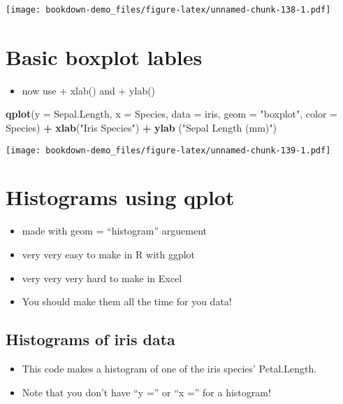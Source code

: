 \documentclass[]{book}
\newenvironment{Shaded}{\begin{snugshade}}{\end{snugshade}}
\newcommand{\KeywordTok}[1]{\textcolor[rgb]{0.13,0.29,0.53}{\textbf{#1}}}
\newcommand{\DataTypeTok}[1]{\textcolor[rgb]{0.13,0.29,0.53}{#1}}
\newcommand{\StringTok}[1]{\textcolor[rgb]{0.31,0.60,0.02}{#1}}
\newcommand{\OperatorTok}[1]{\textcolor[rgb]{0.81,0.36,0.00}{\textbf{#1}}}
\newcommand{\NormalTok}[1]{#1}
\providecommand{\tightlist}{%
  \setlength{\itemsep}{0pt}\setlength{\parskip}{0pt}}
\theoremstyle{definition}
\theoremstyle{definition}
\theoremstyle{definition}
\theoremstyle{remark}
\begin{document}
\texttt{[image: bookdown-demo\_files/figure-latex/unnamed-chunk-138-1.pdf]}

\section{Basic boxplot lables}\label{basic-boxplot-lables}

\begin{itemize}
\tightlist
\item
  now use + xlab() and + ylab()
\end{itemize}

\begin{Shaded}
\begin{Highlighting}[]
\KeywordTok{qplot}\NormalTok{(}\DataTypeTok{y =}\NormalTok{ Sepal.Length,}
      \DataTypeTok{x =}\NormalTok{ Species,    }
        \DataTypeTok{data =}\NormalTok{ iris,}
      \DataTypeTok{geom =} \StringTok{"boxplot"}\NormalTok{,}
      \DataTypeTok{color =}\NormalTok{ Species) }\OperatorTok{+}
\StringTok{  }\KeywordTok{xlab}\NormalTok{(}\StringTok{"Iris Species"}\NormalTok{) }\OperatorTok{+}\StringTok{  }
\StringTok{  }\KeywordTok{ylab}\NormalTok{ (}\StringTok{"Sepal Length (mm)"}\NormalTok{)}
\end{Highlighting}
\end{Shaded}

\texttt{[image: bookdown-demo\_files/figure-latex/unnamed-chunk-139-1.pdf]}

\section{Histograms using qplot}\label{histograms-using-qplot}

\begin{itemize}
\tightlist
\item
  made with geom = ``histogram'' arguement
\item
  very very easy to make in R with ggplot
\item
  very very very hard to make in Excel
\item
  You should make them all the time for you data!
\end{itemize}

\subsection{Histograms of iris data}\label{histograms-of-iris-data}

\begin{itemize}
\tightlist
\item
  This code makes a histogram of one of the iris species' Petal.Length.
\item
  Note that you don't have ``y ='' or ``x ='' for a histogram!
\end{itemize}
\end{document}
